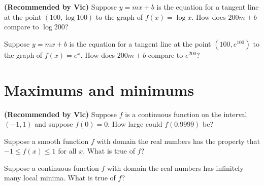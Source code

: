 \documentclass{ximera}
\newcommand{\recommendation}[1]{\textbf{(Recommended by #1)}}
\begin{document}
\begin{problem}
\recommendation{Vic}
  Suppose $y = mx + b$ is the equation for a tangent line at the point $(100,\log 100)$ to the graph of $f(x) = \log x$.  How does $200m + b$ compare to $\log 200$?
  \begin{multipleChoice}
  \end{multipleChoice}
\end{problem}

\begin{problem}
  Suppose $y = mx + b$ is the equation for a tangent line at the point $(100,e^{100})$ to the graph of $f(x) = e^x$.  How does $200m + b$ compare to $e^{200}$?
  \begin{multipleChoice}
  \end{multipleChoice}
\end{problem}

\clearpage

\section{Maximums and minimums}

\begin{problem}
\recommendation{Vic}
  Suppose $f$ is a continuous function on the interval $(-1,1)$ and suppose $f(0) = 0$.  How large could $f(0.9999)$ be?
  \begin{multipleChoice}
  \end{multipleChoice}
\end{problem}

\begin{problem}
  Suppose a smooth function $f$ with domain the real numbers has the property that $-1 \leq f(x) \leq 1$ for all $x$.  What is true of $f$?
  \begin{multipleChoice}
  \end{multipleChoice}
\end{problem}

\begin{problem}
  Suppose a continuous function $f$ with domain the real numbers has infinitely many local minima.  What is true of $f$?
  \begin{multipleChoice}
  \end{multipleChoice}
\end{problem}
\end{document}
